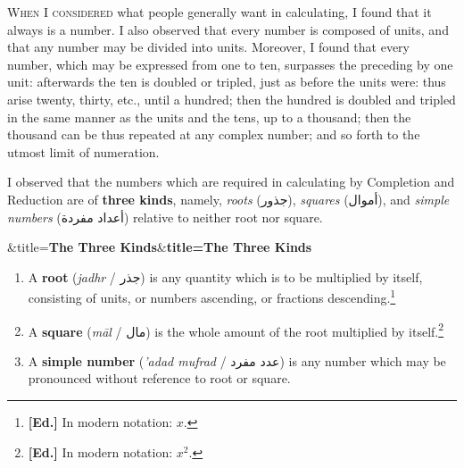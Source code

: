 \documentclass[11pt,a4paper]{book}
\newcommand{\editornote}[1]{\footnote{\textcolor{notecolor}{\textbf{[Ed.]} #1}}}
\newcommand{\ar}[1]{{\arabicfont\beginR #1\endR}}
\newenvironment{transbox}[1][]{%
  \smallskip\par\noindent
  \begin{lrbox}{\transboxsave}
  \begin{minipage}{\dimexpr\linewidth-2\fboxsep-2\fboxrule\relax}%
  \setlength{\parskip}{0.3em}%
  \ifx&#1&\else\textbf{#1}\\[0.2cm]\fi
}{%
  \end{minipage}%
  \end{lrbox}
  \fcolorbox{rulecolor}{transbg}{\usebox{\transboxsave}}%
  \smallskip}
\begin{document}
\begin{minipage}[t]{0.48\textwidth}
\raggedright

\lettrine[lines=2, lhang=0.33, nindent=0em, findent=3pt, loversize=0.14]{
\textcolor{dropgold}{W}}{hen I considered} what people generally want in calculating, I found that it always is a number. I also observed that every number is composed of units, and that any number may be divided into units. Moreover, I found that every number, which may be expressed from one to ten, surpasses the preceding by one unit: afterwards the ten is doubled or tripled, just as before the units were: thus arise twenty, thirty, etc., until a hundred; then the hundred is doubled and tripled in the same manner as the units and the tens, up to a thousand; then the thousand can be thus repeated at any complex number; and so forth to the utmost limit of numeration.

\vspace{0.3cm}

I observed that the numbers which are required in calculating by Completion and Reduction are of \textbf{three kinds}, namely, \textit{roots} (\ar{جذور}), \textit{squares} (\ar{أموال}), and \textit{simple numbers} (\ar{أعداد مفردة}) relative to neither root nor square.

\begin{transbox}[title={\textbf{The Three Kinds}}]
\begin{enumerate}[label=\arabic*.,leftmargin=1.5em,topsep=1pt]
  \item A \textbf{root} (\textit{jadhr} / \ar{جذر}) is any quantity which is to be multiplied by itself, consisting of units, or numbers ascending, or fractions descending.\editornote{In modern notation: $x$.}
  \item A \textbf{square} (\textit{m\=al} / \ar{مال}) is the whole amount of the root multiplied by itself.\editornote{In modern notation: $x^2$.}
  \item A \textbf{simple number} (\textit{'adad mufrad} / \ar{عدد مفرد}) is any number which may be pronounced without reference to root or square.
\end{enumerate}
\end{transbox}

\end{minipage}
\vspace{0.3cm}

\newpage

\end{document}
